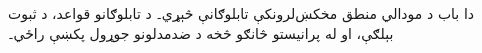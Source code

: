 \documentclass[../../../include/open-logic-chapter]{subfiles}
\begin{document}

\begin{editorial}
  دا باب د مودالي منطق مخکښ‌لرونکې تابلوګانې څېړي۔ د
  تابلوګانو قواعد، د ثبوت بېلګې، او له پرانيستو څانګو څخه
  د ضدمدلونو جوړول پکښې راځي۔
\end{editorial}


\OLEndChapterHook
\end{document}
